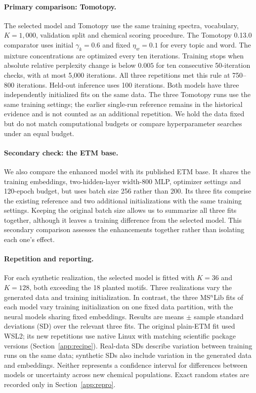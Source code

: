 \documentclass[10pt,a4paper]{article}
\begin{document}
\paragraph{Primary comparison: Tomotopy.}
The selected model and Tomotopy use the same training spectra, vocabulary,
$K=1,000$, validation split and chemical scoring procedure.
The Tomotopy 0.13.0 comparator \cite{tomotopy} uses initial
$\gamma_k=0.6$ and fixed $\eta_w=0.1$ for every topic and word.
The mixture concentrations are optimized every ten iterations. Training stops
when absolute relative perplexity change is below $0.005$ for ten consecutive
50-iteration checks, with at most 5,000 iterations. All three repetitions
met this rule at 750--800 iterations. Held-out inference uses 100 iterations.
Both models have three independently initialized fits on the same data.
The three Tomotopy runs use the same training settings; the earlier
single-run reference remains in the historical evidence and is not counted as
an additional repetition. We hold the data fixed but do not match computational
budgets or compare hyperparameter searches under an equal budget.

\paragraph{Secondary check: the ETM base.}
We also compare the enhanced model with its published ETM base.
It shares the training embeddings, two-hidden-layer
width-800 MLP, optimizer settings and 120-epoch budget, but uses batch size
256 rather than 200. Its three fits comprise the existing reference and two
additional initializations with the same training settings. Keeping the original
batch size allows us to summarize all three fits together, although it leaves
a training difference from the selected model. This secondary comparison
assesses the enhancements together rather than isolating each one's effect.

\paragraph{Repetition and reporting.}
For each synthetic realization, the selected model is fitted with $K=36$
and $K=128$, both exceeding the 18 planted motifs. Three realizations vary
the generated data and training initialization. In contrast, the three
MS$^{n}$Lib fits of each model vary training initialization on one fixed data
partition, with the neural models sharing fixed embeddings. Results are means
$\pm$ sample standard deviations (SD)
over the relevant three fits. The original plain-ETM fit used WSL2; its new
repetitions use native Linux with matching scientific package versions
(Section~\ref{app:recipe}). Real-data SDs describe variation between training
runs on the same data; synthetic SDs also include variation in the generated data and
embeddings. Neither represents a confidence interval for differences between
models or uncertainty across new chemical populations.
Exact random states are recorded only in Section~\ref{app:repro}.
\end{document}
